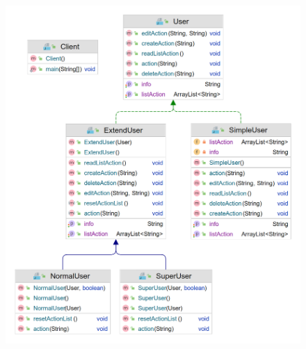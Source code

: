 \documentclass{article}
\begin{document}
\begin{itemize}
        \begin{figure}[htp]
            \includegraphics[scale=0.4]{./image/decorator-example.png}
        \end{figure}
    \end{itemize}
    \pagebreak
\end{document}
